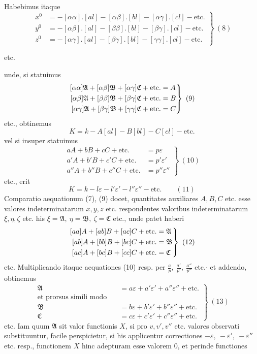 Habebimus itaque
\[
\left.\begin{aligned}
x^0&=-[\alpha\alpha].[al]-[\alpha\beta].[bl]-[\alpha\gamma].[cl]-\text{etc.}\\
y^0&=-[\alpha\beta].[al]-[\beta\beta].[bl]-[\beta\gamma].[cl]-\text{etc.}\\
z^0&=-[\alpha\gamma].[al]-[\beta\gamma].[bl]-[\gamma\gamma].[cl]-\text{etc.}
\end{aligned}\right\}\ (8)
\]
\begin{center}etc.\end{center}
unde, si statuimus
\[
\left.\begin{aligned}\relax
[\alpha\alpha]\mathfrak A+[\alpha\beta]\mathfrak B+[\alpha\gamma]\mathfrak C+\text{etc.}&=A\\
[\alpha\beta]\mathfrak A+[\beta\beta]\mathfrak B+[\beta\gamma]\mathfrak C+\text{etc.}&=B\\
[\alpha\gamma]\mathfrak A+[\beta\gamma]\mathfrak B+[\gamma\gamma]\mathfrak C+\text{etc.}&=C
\end{aligned}\right\}\ (9)
\]
etc., obtinemus
\[
K=k-A[al]-B[bl]-C[cl]-\text{etc.}
\]
vel si insuper statuimus
\[
\left.\begin{aligned}
aA+bB+cC+\text{etc.}&=p\varepsilon\\
a'A+b'B+c'C+\text{etc.}&=p'\varepsilon'\\
a''A+b''B+c''C+\text{etc.}&=p''\varepsilon''
\end{aligned}\right\}\ (10)
\]
etc., erit
\[
K=k-l\varepsilon-l'\varepsilon'-l''\varepsilon''-\text{etc.}\qquad(11)
\]
Comparatio aequationum (7), (9) docet, quantitates auxiliares \(A,B,C\) etc. esse valores indeterminatarum \(x,y,z\) etc. respondentes valoribus indeterminatarum \(\xi,\eta,\zeta\) etc. his \(\xi=\mathfrak A,\ \eta=\mathfrak B,\ \zeta=\mathfrak C\) etc., unde patet haberi
\[
\left.\begin{aligned}\relax
[aa]A+[ab]B+[ac]C+\text{etc.}&=\mathfrak A\\
[ab]A+[bb]B+[bc]C+\text{etc.}&=\mathfrak B\\
[ac]A+[bc]B+[cc]C+\text{etc.}&=\mathfrak C
\end{aligned}\right\}\ (12)
\]
etc. Multiplicando itaque aequationes (10) resp. per \(\frac ap,\ \frac{a'}{p'},\ \frac{a''}{p''}\) etc.\(\cdot\) et addendo, obtinemus
\[
\left.\begin{aligned}
\mathfrak A&=a\varepsilon+a'\varepsilon'+a''\varepsilon''+\text{etc.}\\
\text{et prorsus simili modo}\quad&\\
\mathfrak B&=b\varepsilon+b'\varepsilon'+b''\varepsilon''+\text{etc.}\\
\mathfrak C&=c\varepsilon+c'\varepsilon'+c''\varepsilon''+\text{etc.}
\end{aligned}\right\}\ (13)
\]
etc. Iam quum \(\mathfrak A\) sit valor functionis \(X\), si pro \(v,v',v''\) etc. valores observati substituuntur, facile perspicietur, si his applicentur correctiones \(-\varepsilon,\ -\varepsilon',\ -\varepsilon''\) etc. resp., functionem \(X\) hinc adepturam esse valorem \(0\), et perinde functiones
